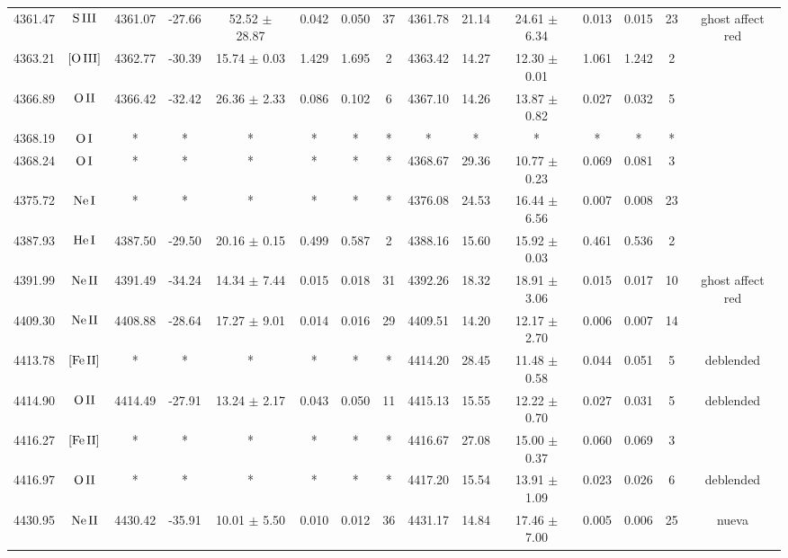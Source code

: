 \documentclass{article}
\begin{document}
\begin{table*}
\begin{adjustbox}{width=\textwidth}
\begin{tabular}{ccccccccccccccc}
4361.47 & $\mbox{S}\thinspace \mbox{III}$ & 4361.07 & -27.66 & 52.52 $\pm$ 28.87 & 0.042 & 0.050 & 37 & 4361.78 & 21.14 & 24.61 $\pm$ 6.34 & 0.013 & 0.015 & 23 &  ghost affect red \\
4363.21 & $\mbox{[O}\thinspace \mbox{III]}$ & 4362.77 & -30.39 & 15.74 $\pm$ 0.03 & 1.429 & 1.695 & 2 & 4363.42 & 14.27 & 12.30 $\pm$ 0.01 & 1.061 & 1.242 & 2 &  \\
4366.89 & $\mbox{O}\thinspace \mbox{II}$ & 4366.42 & -32.42 & 26.36 $\pm$ 2.33 & 0.086 & 0.102 & 6 & 4367.10 & 14.26 & 13.87 $\pm$ 0.82 & 0.027 & 0.032 & 5 &  \\
4368.19 & $\mbox{O}\thinspace \mbox{I}$ & * & * & * & * & * & * & * & * & * & * & * & * &  \\
4368.24 & $\mbox{O}\thinspace \mbox{I}$ & * & * & * & * & * & * & 4368.67 & 29.36 & 10.77 $\pm$ 0.23 & 0.069 & 0.081 & 3 &  \\
4375.72 & $\mbox{Ne}\thinspace \mbox{I}$ & * & * & * & * & * & * & 4376.08 & 24.53 & 16.44 $\pm$ 6.56 & 0.007 & 0.008 & 23 &  \\
4387.93 & $\mbox{He}\thinspace \mbox{I}$ & 4387.50 & -29.50 & 20.16 $\pm$ 0.15 & 0.499 & 0.587 & 2 & 4388.16 & 15.60 & 15.92 $\pm$ 0.03 & 0.461 & 0.536 & 2 &  \\
4391.99 & $\mbox{Ne}\thinspace \mbox{II}$ & 4391.49 & -34.24 & 14.34 $\pm$ 7.44 & 0.015 & 0.018 & 31 & 4392.26 & 18.32 & 18.91 $\pm$ 3.06 & 0.015 & 0.017 & 10 &  ghost affect red \\
4409.30 & $\mbox{Ne}\thinspace \mbox{II}$ & 4408.88 & -28.64 & 17.27 $\pm$ 9.01 & 0.014 & 0.016 & 29 & 4409.51 & 14.20 & 12.17 $\pm$ 2.70 & 0.006 & 0.007 & 14 &  \\
4413.78 & $\mbox{[Fe}\thinspace \mbox{II]}$ & * & * & * & * & * & * & 4414.20 & 28.45 & 11.48 $\pm$ 0.58 & 0.044 & 0.051 & 5 &  deblended \\
4414.90 & $\mbox{O}\thinspace \mbox{II}$ & 4414.49 & -27.91 & 13.24 $\pm$ 2.17 & 0.043 & 0.050 & 11 & 4415.13 & 15.55 & 12.22 $\pm$ 0.70 & 0.027 & 0.031 & 5 &  deblended \\
4416.27 & $\mbox{[Fe}\thinspace \mbox{II]}$ & * & * & * & * & * & * & 4416.67 & 27.08 & 15.00 $\pm$ 0.37 & 0.060 & 0.069 & 3 &  \\
4416.97 & $\mbox{O}\thinspace \mbox{II}$ & * & * & * & * & * & * & 4417.20 & 15.54 & 13.91 $\pm$ 1.09 & 0.023 & 0.026 & 6 &  deblended \\
4430.95 & $\mbox{Ne}\thinspace \mbox{II}$ & 4430.42 & -35.91 & 10.01 $\pm$ 5.50 & 0.010 & 0.012 & 36 & 4431.17 & 14.84 & 17.46 $\pm$ 7.00 & 0.005 & 0.006 & 25 &  nueva \\

\end{tabular}
\end{adjustbox}
\end{table*}
\end{document}
